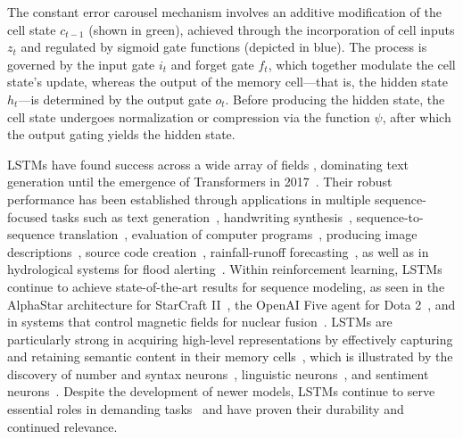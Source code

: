 The constant error carousel mechanism involves an additive modification of the cell state $c_{t-1}$ (shown in green), achieved through the incorporation of cell inputs $z_t$ and regulated by sigmoid gate functions (depicted in blue). The process is governed by the input gate $i_t$ and forget gate $f_t$, which together modulate the cell state's update, whereas the output of the memory cell—that is, the hidden state $h_t$—is determined by the output gate $o_t$. Before producing the hidden state, the cell state undergoes normalization or compression via the function $\psi$, after which the output gating yields the hidden state.

LSTMs have found success across a wide array of fields \citep{Hochreiter:01,Hochreiter:07,Schmidhuber:15}, dominating text generation until the emergence of Transformers in 2017~\citep{Vaswani:17}. Their robust performance has been established through applications in multiple sequence-focused tasks such as text generation~\citep{Graves:13,Karpathy:15blog}, handwriting synthesis~\citep{Graves:13}, sequence-to-sequence translation~\citep{Sutskever:14nips}, evaluation of computer programs~\citep{Zaremba:14arxiv}, producing image descriptions~\citep{Karpathy:15,Hossain:19}, source code creation~\citep{Karpathy:15blog}, rainfall-runoff forecasting~\citep{Kratzert:18,Kratzert:19}, as well as in hydrological systems for flood alerting~\citep{Nearing:24}. Within reinforcement learning, LSTMs continue to achieve state-of-the-art results for sequence modeling, as seen in the AlphaStar architecture for StarCraft II~\citep{Vinyals:17short}, the OpenAI Five agent for Dota 2~\citep{OpenAI:19}, and in systems that control magnetic fields for nuclear fusion~\citep{Degrave:22short}. LSTMs are particularly strong in acquiring high-level representations by effectively capturing and retaining semantic content in their memory cells~\citep{Karpathy:15blog}, which is illustrated by the discovery of number and syntax neurons~\citep{Lakretz:19}, linguistic neurons~\citep{Bau:19}, and sentiment neurons~\citep{Radford:17arxiv}. Despite the development of newer models, LSTMs continue to serve essential roles in demanding tasks~\citep{Degrave:22short,Nearing:24} and have proven their durability and continued relevance.

